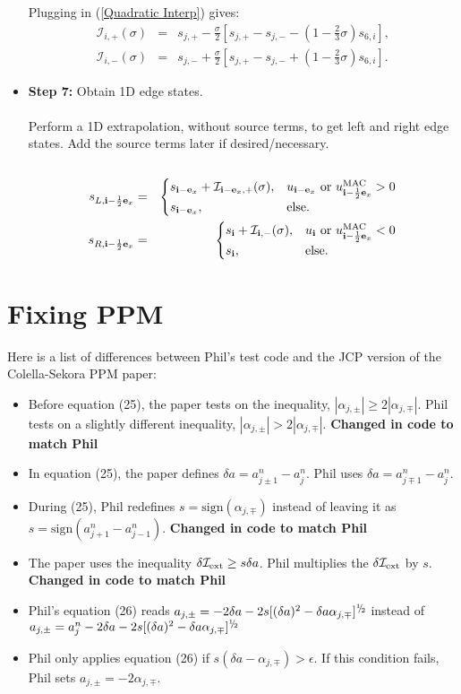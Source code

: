 \begin{itemize}
Plugging in (\ref{Quadratic Interp}) gives:
\begin{eqnarray}
\mathcal{I}_{i,+}(\sigma) &=& s_{j,+} - \frac{\sigma}{2}\left[s_{j,+}-s_{j,-}-\left(1-\frac{2}{3}\sigma\right)s_{6,i}\right], \\
\mathcal{I}_{i,-}(\sigma) &=& s_{j,-} + \frac{\sigma}{2}\left[s_{j,+}-s_{j,-}+\left(1-\frac{2}{3}\sigma\right)s_{6,i}\right].
\end{eqnarray}
\item {\bf Step 7:} Obtain 1D edge states.\\ \\
Perform a 1D extrapolation, without source terms, to get 
left and right edge states.  Add the source terms later if desired/necessary.\\ \\
\begin{eqnarray}
s_{L,{\bf i}-\frac{1}{2}{\bf e}_x} &=&
\begin{cases}
s_{{\bf i}-{\bf e}_x} + \mathcal{I}_{{\bf i}-{\bf e}_x,+}(\sigma), & u_{{\bf i}-{\bf e}_x} ~ \text{or} ~ u_{{\bf i}-\frac{1}{2}{\bf e}_x}^{\rm MAC} > 0 \\
s_{{\bf i}-{\bf e}_x}, & \text{else}.
\end{cases}\\
s_{R,{\bf i}-\frac{1}{2}{\bf e}_x} &=& 
\begin{cases}
s_{{\bf i}} + \mathcal{I}_{{\bf i},-}(\sigma), & u_{{\bf i}} ~ \text{or} ~ u_{{\bf i}-\frac{1}{2}{\bf e}_x}^{\rm MAC} < 0 \\
s_{{\bf i}}, & \text{else}.
\end{cases}
\end{eqnarray}
\end{itemize}
\cleardoublepage
\section{Fixing PPM}
Here is a list of differences between Phil's test code and the JCP version of the Colella-Sekora PPM paper:
\begin{itemize}
\item Before equation (25), the paper tests on the inequality, $|\alpha_{j,\pm}| \ge 2|\alpha_{j,\mp}|$.  Phil tests on a slightly different inequality, $|\alpha_{j,\pm}| > 2|\alpha_{j,\mp}|$. {\bf Changed in code to match Phil}
\item In equation (25), the paper defines $\delta a = a_{j\pm 1}^n - a_j^n$.  Phil uses $\delta a = a_{j\mp 1}^n - a_j^n$.
\item During (25), Phil redefines $s = \text{sign}(\alpha_{j,\mp})$ instead of leaving it as $s = \text{sign}(a_{j+1}^n - a_{j-1}^n)$. {\bf Changed in code to match Phil}
\item The paper uses the inequality $\delta\mathcal{I}_{\rm ext} \ge s\delta a$.  Phil multiplies the $\delta\mathcal{I}_{\rm ext}$ by $s$. {\bf Changed in code to match Phil}
\item Phil's equation (26) reads $a_{j,\pm} = -2\delta a - 2s[(\delta a)^2 - \delta a \alpha_{j,\mp}]^{\myhalf}$ instead of $a_{j,\pm} = a_j^n - 2\delta a - 2s[(\delta a)^2 - \delta a \alpha_{j,\mp}]^{\myhalf}$
\item Phil only applies equation (26) if $s(\delta a - \alpha_{j,\mp}) > \epsilon$.  If this condition fails, Phil sets $a_{j,\pm} = -2\alpha_{j,\mp}$.
\end{itemize}
